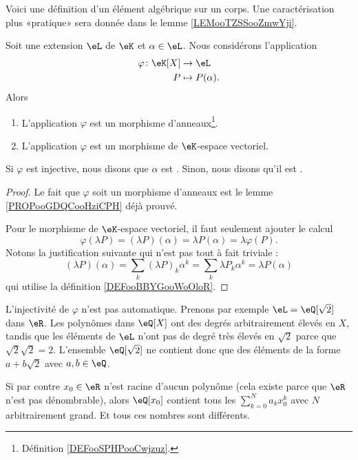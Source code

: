 Voici une définition d'un élément algébrique sur un corps. Une caractérisation plus «pratique» sera donnée dans le lemme \ref{LEMooTZSSooZmwYji}.
\begin{lemmaDef} \label{LEMooLVPLooEkWYDN}
	Soit une extension \( \eL\) de \( \eK\) et \( \alpha\in \eL\). Nous considérons l'application
	\begin{equation}
		\begin{aligned}
			\varphi\colon \eK[X] & \to \eL            \\
			P                    & \mapsto P(\alpha).
		\end{aligned}
	\end{equation}
	Alors
	\begin{enumerate}
		\item
		      L'application \( \varphi\) est un morphisme d'anneaux\footnote{Définition \ref{DEFooSPHPooCwjzuz}.}.
		\item
		      L'application \( \varphi\) est un morphisme de \( \eK\)-espace vectoriel.
	\end{enumerate}
	Si \( \varphi\) est injective, nous disons que \( \alpha\) est . Sinon, nous disons qu'il est .
\end{lemmaDef}

\begin{proof}
	Le fait que \( \varphi\) soit un morphisme d'anneaux est le lemme \ref{PROPooGDQCooHziCPH} déjà prouvé.

	Pour le morphisme de \( \eK\)-espace vectoriel, il faut seulement ajouter le calcul
	\begin{equation}
		\varphi(\lambda P)=(\lambda P)(\alpha)=\lambda P(\alpha)=\lambda \varphi(P).
	\end{equation}
	Notons la justification suivante qui n'est pas tout à fait triviale :
	\begin{equation}
		(\lambda P)(\alpha)=\sum_k(\lambda P)_k\alpha^k=\sum_k\lambda P_k\alpha^k=\lambda P(\alpha)
	\end{equation}
	qui utilise la définition \ref{DEFooBBYGooWoOloR}.
\end{proof}

\begin{example}
	L'injectivité de \( \varphi\) n'est pas automatique. Prenons par exemple \( \eL=\eQ[\sqrt{ 2 }]\) dans \( \eR\). Les polynômes dans \( \eQ[X]\) ont des degrés arbitrairement élevés en \( X\), tandis que les éléments de \( \eL\) n'ont pas de degré très élevés en \( \sqrt{ 2 }\) parce que \( \sqrt{ 2 }\sqrt{ 2 }=2\). L'ensemble \( \eQ[\sqrt{ 2 }]\) ne contient donc que des éléments de la forme \( a+b\sqrt{ 2 }\) avec \( a,b\in \eQ\).

	Si par contre \( x_0\in \eR\) n'est racine d'aucun polynôme (cela existe parce que \( \eR\) n'est pas dénombrable), alors \( \eQ[x_0]\) contient tous les \( \sum_{k=0}^Na_kx_0^k\) avec \( N\) arbitrairement grand. Et tous ces nombres sont différents.
\end{example}

